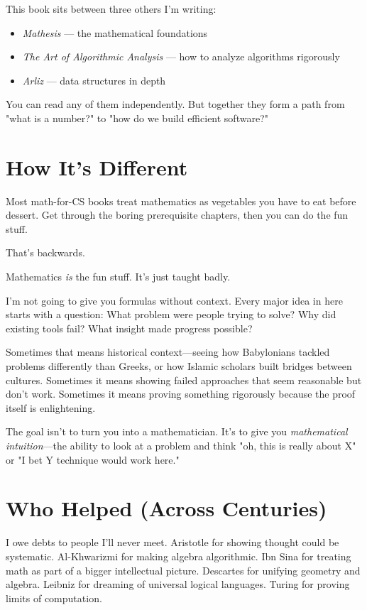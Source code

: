 This book sits between three others I'm writing:
\begin{itemize}
    \item \textit{Mathesis} — the mathematical foundations
    \item \textit{The Art of Algorithmic Analysis} — how to analyze algorithms rigorously
    \item \textit{Arliz} — data structures in depth
\end{itemize}

You can read any of them independently. But together they form a path from "what is a number?" to "how do we build efficient software?"

\section*{How It's Different}

Most math-for-CS books treat mathematics as vegetables you have to eat before dessert. Get through the boring prerequisite chapters, then you can do the fun stuff.

That's backwards.

Mathematics \textit{is} the fun stuff. It's just taught badly.

I'm not going to give you formulas without context. Every major idea in here starts with a question: What problem were people trying to solve? Why did existing tools fail? What insight made progress possible?

Sometimes that means historical context—seeing how Babylonians tackled problems differently than Greeks, or how Islamic scholars built bridges between cultures. Sometimes it means showing failed approaches that seem reasonable but don't work. Sometimes it means proving something rigorously because the proof itself is enlightening.

The goal isn't to turn you into a mathematician. It's to give you \textit{mathematical intuition}—the ability to look at a problem and think "oh, this is really about X" or "I bet Y technique would work here."

\section*{Who Helped (Across Centuries)}

I owe debts to people I'll never meet. Aristotle for showing thought could be systematic. Al-Khwarizmi for making algebra algorithmic. Ibn Sina for treating math as part of a bigger intellectual picture. Descartes for unifying geometry and algebra. Leibniz for dreaming of universal logical languages. Turing for proving limits of computation.

